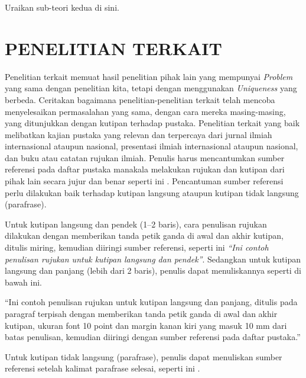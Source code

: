 Uraikan sub-teori kedua di sini.

\section{PENELITIAN TERKAIT}

Penelitian terkait memuat hasil penelitian pihak lain yang mempunyai \textit{Problem}
yang sama dengan penelitian kita, tetapi dengan menggunakan \textit{Uniqueness} yang
berbeda. Ceritakan bagaimana penelitian-penelitian terkait telah mencoba menyelesaikan
permasalahan yang sama, dengan cara mereka masing-masing, yang ditunjukkan dengan
kutipan terhadap pustaka. Penelitian terkait yang baik melibatkan kajian pustaka yang
relevan dan terpercaya dari jurnal ilmiah internasional ataupun nasional, presentasi
ilmiah internasional ataupun nasional, dan buku atau catatan rujukan ilmiah. Penulis
harus mencantumkan sumber referensi pada daftar pustaka manakala melakukan rujukan dan
kutipan dari pihak lain secara jujur dan benar seperti ini \cite{jurnal_contoh}.
Pencantuman sumber referensi perlu dilakukan baik terhadap kutipan langsung ataupun
kutipan tidak langsung (parafrase).

Untuk kutipan langsung dan pendek (1--2 baris), cara penulisan rujukan dilakukan dengan
memberikan tanda petik ganda di awal dan akhir kutipan, ditulis miring, kemudian diiringi
sumber referensi, seperti ini \textit{``Ini contoh penulisan rujukan untuk kutipan
langsung dan pendek''}\cite{buku_contoh,jurnal_contoh}. Sedangkan untuk kutipan langsung
dan panjang (lebih dari 2 baris), penulis dapat menuliskannya seperti di bawah ini.

\begin{kutipanpanjang}
  ``Ini contoh penulisan rujukan untuk kutipan langsung dan panjang, ditulis pada
  paragraf terpisah dengan memberikan tanda petik ganda di awal dan akhir kutipan,
  ukuran font 10 point dan margin kanan kiri yang masuk 10 mm dari batas penulisan,
  kemudian diiringi dengan sumber referensi pada daftar pustaka.'' \cite{buku_contoh}
\end{kutipanpanjang}

Untuk kutipan tidak langsung (parafrase), penulis dapat menuliskan sumber referensi
setelah kalimat parafrase selesai, seperti ini \cite{online_contoh}.